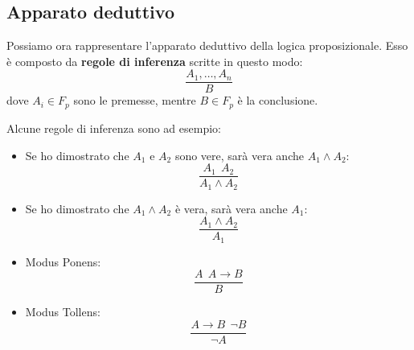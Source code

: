 \subsection{Apparato deduttivo}
Possiamo ora rappresentare l'apparato deduttivo della logica proposizionale. Esso
è composto da \textbf{regole di inferenza} scritte in questo modo:
\begin{equation}
    \frac{A_1, \dots, A_n}{B}
\end{equation}
dove $A_i \in F_p$ sono le premesse, mentre $B \in F_p$ è la conclusione.

Alcune regole di inferenza sono ad esempio:
\begin{itemize}
    \item Se ho dimostrato che $A_1$ e $A_2$ sono vere, sarà vera anche $A_1 \land A_2$:
          \begin{equation}
              \frac{A_1 \ \ A_2}{A_1 \land A_2}
          \end{equation}
    \item Se ho dimostrato che $A_1 \land A_2$ è vera, sarà vera anche $A_1$:
          \begin{equation}
              \frac{A_1 \land A_2}{A_1}
          \end{equation}
    \item Modus Ponens:
          \begin{equation}
              \frac{A \ \ A \to B}{B}
          \end{equation}
    \item Modus Tollens:
          \begin{equation}
              \frac{A \to B \ \ \lnot B}{\lnot A}
          \end{equation}
\end{itemize}

